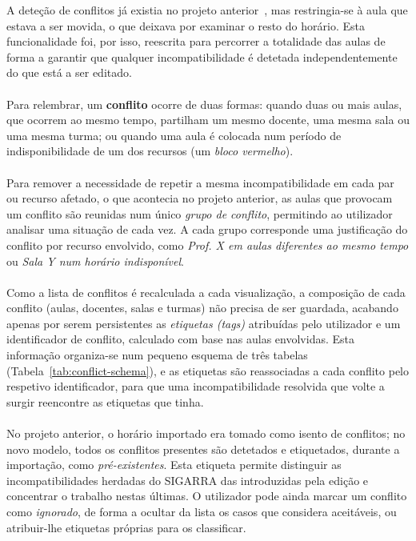 \documentclass[10pt]{article}
\begin{document}
    A deteção de conflitos já existia no projeto anterior~\cite{oliveira2025}, mas restringia-se à aula que estava a ser movida, o que deixava por examinar o resto do horário. Esta funcionalidade foi, por isso, reescrita para percorrer a totalidade das aulas de forma a garantir que qualquer incompatibilidade é detetada independentemente do que está a ser editado. 
    \\\\
    Para relembrar, um \textbf{conflito} ocorre de duas formas: quando duas ou mais aulas, que ocorrem ao mesmo tempo, partilham um mesmo docente, uma mesma sala ou uma mesma turma; ou quando uma aula é colocada num período de indisponibilidade de um dos recursos (um \emph{bloco vermelho}). 
    \\\\
    Para remover a necessidade de repetir a mesma incompatibilidade em cada par ou recurso afetado, o que acontecia no projeto anterior, as aulas que provocam um conflito são reunidas num único \emph{grupo de conflito}, permitindo ao utilizador analisar uma situação de cada vez. A cada grupo corresponde uma justificação do conflito por recurso envolvido, como \emph{Prof. X em aulas diferentes ao mesmo tempo} ou \emph{Sala Y num horário indisponível}.
    \\\\
    Como a lista de conflitos é recalculada a cada visualização, a composição de cada conflito (aulas, docentes, salas e turmas) não precisa de ser guardada, acabando apenas por serem persistentes as \emph{etiquetas (tags)} atribuídas pelo utilizador e um identificador de conflito, calculado com base nas aulas envolvidas. Esta informação organiza-se num pequeno esquema de três tabelas (Tabela~\ref{tab:conflict-schema}), e as etiquetas são reassociadas a cada conflito pelo respetivo identificador, para que uma incompatibilidade resolvida que volte a surgir reencontre as etiquetas que tinha.
    \\\\
    No projeto anterior, o horário importado era tomado como isento de conflitos; no novo modelo, todos os conflitos presentes são detetados e etiquetados, durante a importação, como \emph{pré-existentes}. Esta etiqueta permite distinguir as incompatibilidades herdadas do SIGARRA das introduzidas pela edição e concentrar o trabalho nestas últimas. O utilizador pode ainda marcar um conflito como \emph{ignorado}, de forma a ocultar da lista os casos que considera aceitáveis, ou atribuir-lhe etiquetas próprias para os classificar. 
\end{document}
